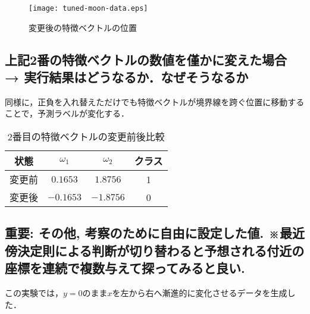 \documentclass[a4j, 10pt]{jarticle}
\begin{document}
\begin{figure}[H]
  \centering
  \texttt{[image: tuned-moon-data.eps]}
  \caption{変更後の特徴ベクトルの位置}\label{changed-data-location}
\end{figure}


\subsection{上記2番の特徴ベクトルの数値を僅かに変えた場合 → 実行結果はどうなるか．なぜそうなるか}
同様に，正負を入れ替えただけでも特徴ベクトルが境界線を跨ぐ位置に移動することで，予測ラベルが変化する．

\begin{table}[H]
  \caption{2番目の特徴ベクトルの変更前後比較}\label{second-data-modification}
  \centering
    \begin{tabular}{|c|c|c|c|}
      \hline
      状態 & $\omega_1$ & $\omega_2$ & クラス \\
      \hline
      変更前 & $0.1653$ & $1.8756$ & 1 \\
      \hline
      変更後 & $-0.1653$ & $-1.8756$ & 0 \\
      \hline
    \end{tabular}
\end{table}

\subsection{重要: その他, 考察のために自由に設定した値. ※最近傍決定則による判断が切り替わると予想される付近の座標を連続で複数与えて探ってみると良い.}
この実験では，$y=0$のまま$x$を左から右へ漸進的に変化させるデータを生成した．

\begin{table}[H]
  \centering
  \caption{漸進的データとラベルの変化（横向き）}\label{tab:boundary-gradient-data-horizontal}
\end{table}
\end{document}
